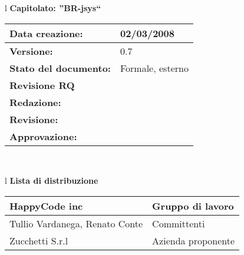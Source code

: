 

\newcommand{\lv}{ 0.7 } %
\newcommand{\dt}{ Test Report }%


\begin{center}
\thispagestyle{plain}
\begin{table}[htbp]
\large{
\begin{tabular}{l}
\Large{\textbf{\textsf{Capitolato: ''BR-jsys``}}} \\
\begin{tabular}{|p{6cm}|p{6cm}|}
\hline
\textbf{Data creazione:} & 02/03/2008 \\ \hline
\textbf{Versione:} & \lv \\ \hline
\textbf{Stato del documento:} & Formale, esterno \\ \hline
\textbf{Revisione RQ} & \\ \hline
\textbf{Redazione:} & \MT \\ \hline
\textbf{Revisione:} & \MB \\ \hline
\textbf{Approvazione:}  & \AT  \\ \hline
\end{tabular} \\
\end{tabular}
}
\end{table}

\begin{table}[hbtp]
\large{
\begin{tabular}{l}
\Large{\textbf{\textsf{Lista di distribuzione}}} \\
\begin{tabular}{|p{6cm}|p{6cm}|} \hline
{HappyCode inc}& Gruppo di lavoro \\ \hline
{Tullio Vardanega, Renato Conte}& Committenti \\ \hline 
{Zucchetti S.r.l}& Azienda proponente\\ \hline
\end{tabular} \\
\end{tabular}
}
\end{table}
\begin{table}[hbtp]


\end{table}
\end{center}
